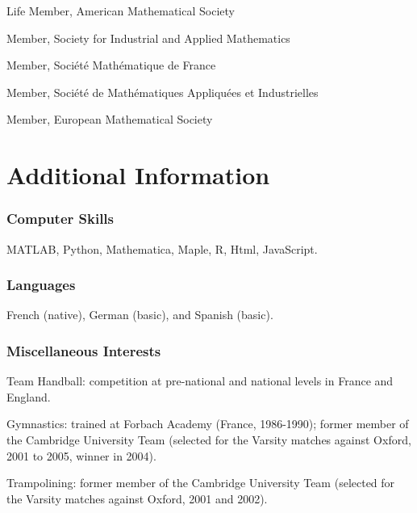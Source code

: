 \documentclass[11pt]{article}
\begin{document}
\bitemize
\item Life Member, American Mathematical Society
\item Member, Society for Industrial and Applied Mathematics
\item Member, Soci\'{e}t\'{e} Math\'{e}matique de France
\item Member, Soci\'et\'e de Math\'ematiques Appliqu\'ees et Industrielles
\item Member, European Mathematical Society
\eitemize


\section{Additional Information}

\subsubsection{Computer Skills} 
MATLAB, Python, Mathematica, Maple, R, Html, JavaScript.

\subsubsection{Languages}
French (native), German (basic), and Spanish (basic).

\subsubsection{Miscellaneous Interests} 
\bitemize
\item Team Handball: competition at pre-national and national levels in France and England.
\item Gymnastics:  trained at Forbach Academy (France, 1986-1990); former member of the Cambridge University Team (selected for the Varsity matches against Oxford, 2001 to 2005, winner in 2004).
\item Trampolining: former member of the Cambridge University Team (selected for the Varsity matches against Oxford, 2001 and 2002).
\eitemize

\end{document}
